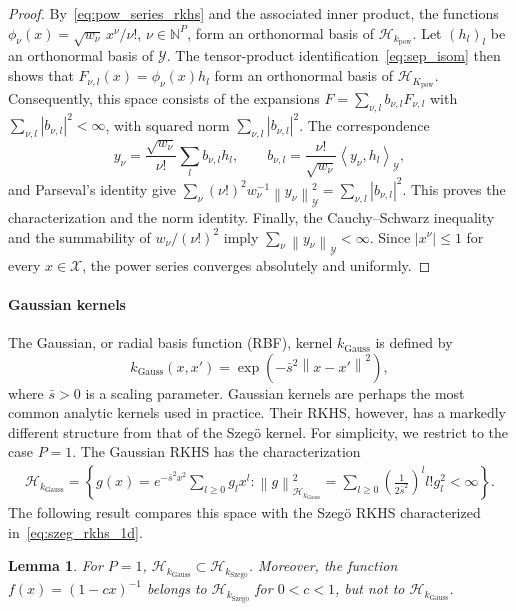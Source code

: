 \documentclass[11pt]{article}
\numberwithin{equation}{section}
\theoremstyle{plain}
\newtheorem{lemma}[theorem]{Lemma}
\theoremstyle{definition}
\theoremstyle{remark}
\newcommand{\X}{\mathcal{X}}
\newcommand{\Hs}{\mathcal{H}}
\newcommand{\Y}{\mathcal{Y}}
\newcommand{\norm}[1]{\left\lVert#1\right\rVert}
\newcommand{\innerpro}[1]{\left\langle#1\right\rangle}
\begin{document}
\begin{proof}
By~\eqref{eq:pow_series_rkhs} and the associated inner product,
the functions
$\phi_\nu(x)=\sqrt{w_\nu}\,x^\nu/\nu!$, $\nu\in\mathbb{N}^P$,
form an orthonormal basis of $\Hs_{k_{\mathrm{pow}}}$.
Let $(h_l)_l$ be an orthonormal basis of $\Y$.
The tensor-product identification~\eqref{eq:sep_isom}
then shows that
\(
F_{\nu,l}(x)=\phi_\nu(x)h_l
\)
form an orthonormal basis of $\Hs_{K_{\mathrm{pow}}}$.
Consequently, this space consists of the expansions
$F=\sum_{\nu,l}b_{\nu,l}F_{\nu,l}$ with $\sum_{\nu,l}|b_{\nu,l}|^2<\infty$,
with squared norm $\sum_{\nu,l}|b_{\nu,l}|^2$.
The correspondence
\[
y_\nu=\frac{\sqrt{w_\nu}}{\nu!}\sum_l b_{\nu,l}h_l,
\qquad
b_{\nu,l}=\frac{\nu!}{\sqrt{w_\nu}}
\innerpro{y_\nu,h_l}_{\Y},
\]
and Parseval's identity give
$\sum_{\nu}(\nu!)^2w_\nu^{-1}\norm{y_\nu}_{\Y}^2=\sum_{\nu,l}|b_{\nu,l}|^2$.
This proves the characterization and the norm identity.
Finally, the Cauchy--Schwarz inequality and the summability
of $w_\nu/(\nu!)^2$ imply
$\sum_\nu\norm{y_\nu}_{\Y}<\infty$.
Since $|x^\nu|\leq1$ for every  $x\in\X$, the power series converges
absolutely and uniformly.
\end{proof}

\paragraph{Gaussian kernels}

The Gaussian, or radial basis function (RBF), kernel
$k_{\text{Gauss}}$ is defined by
\begin{equation} \label{eq:gauss}
k_{\text{Gauss}}(x,x')
=
\exp\left(-\bar s^2\norm{x-x'}^2\right),
\end{equation}
where $\bar s>0$ is a scaling parameter. Gaussian kernels are perhaps the most
common analytic kernels used in practice. Their RKHS, however, has a
markedly different structure from that of the Szegö kernel. For simplicity,
we restrict to the case $P=1$. The Gaussian RKHS has the characterization
\cite{minh2010some,steinwart2008support}
\begin{align}\label{eq:gauss_rkhs_1d}
\Hs_{k_{\text{Gauss}}}
=
\left\{
g(x)=e^{-\bar s^2x^2}\sum_{l\geq0}g_lx^l:
\norm{g}_{\Hs_{k_{\text{Gauss}}}}^2
=
\sum_{l\geq0}
\left(\frac{1}{2\bar s^2}\right)^l l!g_l^2<\infty
\right\}.
\end{align}
The following result compares this space with the Szegö RKHS characterized
in~\eqref{eq:szeg_rkhs_1d}.

\begin{lemma}
\label{lem:gauss_szeg}
For $P=1$, $\Hs_{k_{\text{Gauss}}}\subset\Hs_{k_{\mathrm{Szeg\ddot{o}}}}$.
Moreover, the function $f(x)=(1-cx)^{-1}$ belongs to
$\Hs_{k_{\mathrm{Szeg\ddot{o}}}}$ for $0<c<1$, but not to
$\Hs_{k_{\text{Gauss}}}$.
\end{lemma}
\end{document}
